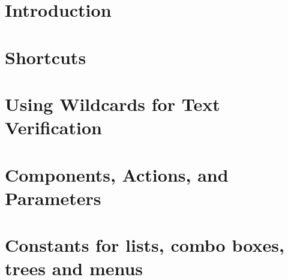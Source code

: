 


\tableofcontents
\renewcommand{\bxcomment}[2]{}%
\clearpage

\chapter{Introduction}

\clearpage

\chapter{Shortcuts}

\clearpage

\chapter{Using Wildcards for Text Verification}
\label{regex}
\label{simplematch}

\clearpage

\chapter{Components, Actions, and Parameters}
 \label{actparam}
 
 \clearpage

\chapter{Constants for lists, combo boxes, trees and menus}
\label{constants}

\clearpage

